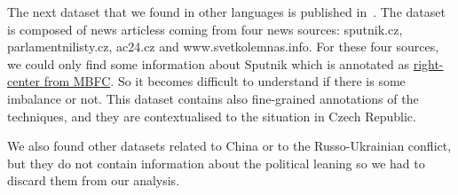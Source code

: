 The next dataset that we found in other languages is published in~\citet{baisa2019benchmark}.
The dataset is composed of news articless coming from four news sources: sputnik.cz, parlamentnilisty.cz, ac24.cz and www.svetkolemnas.info. For these four sources, we could only find some information about Sputnik which is annotated as \href{https://mediabiasfactcheck.com/sputnik-news/}{right-center from MBFC}.
So it becomes difficult to understand if there is some imbalance or not.
This dataset contains also fine-grained annotations of the techniques, and they are contextualised to the situation in Czech Republic.

We also found other datasets related to China or to the Russo-Ukrainian conflict, but they do not contain information about the political leaning so we had to discard them from our analysis.


